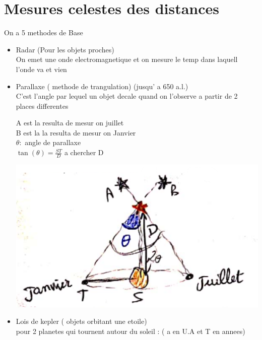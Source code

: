 \documentclass[12pt]{book}
\begin{document}
    \chapter{Mesures celestes des distances}
        On a 5 methodes de Base 
        \begin{itemize}
            \item Radar (Pour les objets proches) \\
                On emet une onde electromagnetique et on mesure le temp dans laquell l'onde va et vien
            \item Parallaxe ( methode de trangulation)  (jusqu' a 650 a.l.) \\
                C'est l'angle par lequel un objet decale quand on l'observe a partir de 2 places differentes \\
                \begin{minipage}{0.7\linewidth}
                    A est la resulta de mesur on juillet \\
                    B est la la resulta de mesur on Janvier \\
                    $ \theta : $ angle de parallaxe \\
                    $ \tan(\theta) = \frac{ST}{D} $ a chercher D
                \end{minipage}
                \begin{minipage}{0.29\linewidth}
                    \includegraphics[width=\linewidth]{pic/parallaxe.png}
                \end{minipage}
            \item Lois de kepler ( objets orbitant une etoile)\\
                pour 2 planetes qui tournent autour du soleil :  ( a en U.A et T en annees)

\end{itemize}
\end{document}
